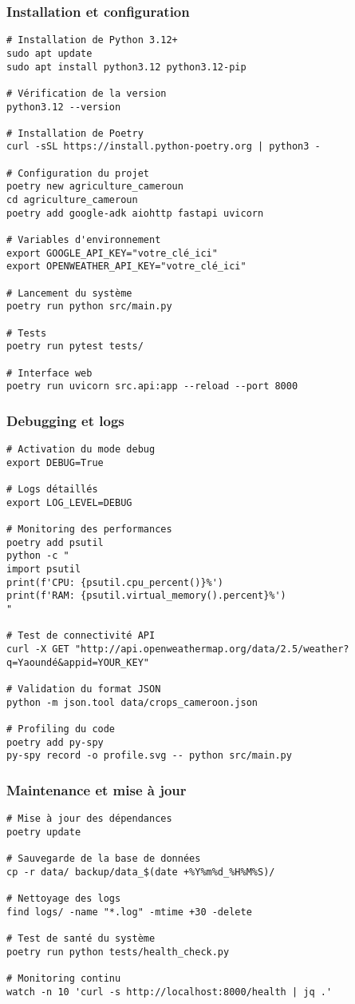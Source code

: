 \subsubsection{Installation et configuration}
\begin{verbatim}
# Installation de Python 3.12+
sudo apt update
sudo apt install python3.12 python3.12-pip

# Vérification de la version
python3.12 --version

# Installation de Poetry
curl -sSL https://install.python-poetry.org | python3 -

# Configuration du projet
poetry new agriculture_cameroun
cd agriculture_cameroun
poetry add google-adk aiohttp fastapi uvicorn

# Variables d'environnement
export GOOGLE_API_KEY="votre_clé_ici"
export OPENWEATHER_API_KEY="votre_clé_ici"

# Lancement du système
poetry run python src/main.py

# Tests
poetry run pytest tests/

# Interface web
poetry run uvicorn src.api:app --reload --port 8000
\end{verbatim}

\subsubsection{Debugging et logs}
\begin{verbatim}
# Activation du mode debug
export DEBUG=True

# Logs détaillés
export LOG_LEVEL=DEBUG

# Monitoring des performances
poetry add psutil
python -c "
import psutil
print(f'CPU: {psutil.cpu_percent()}%')
print(f'RAM: {psutil.virtual_memory().percent}%')
"

# Test de connectivité API
curl -X GET "http://api.openweathermap.org/data/2.5/weather?q=Yaoundé&appid=YOUR_KEY"

# Validation du format JSON
python -m json.tool data/crops_cameroon.json

# Profiling du code
poetry add py-spy
py-spy record -o profile.svg -- python src/main.py
\end{verbatim}

\subsubsection{Maintenance et mise à jour}
\begin{verbatim}
# Mise à jour des dépendances
poetry update

# Sauvegarde de la base de données
cp -r data/ backup/data_$(date +%Y%m%d_%H%M%S)/

# Nettoyage des logs
find logs/ -name "*.log" -mtime +30 -delete

# Test de santé du système
poetry run python tests/health_check.py

# Monitoring continu
watch -n 10 'curl -s http://localhost:8000/health | jq .'
\end{verbatim}

